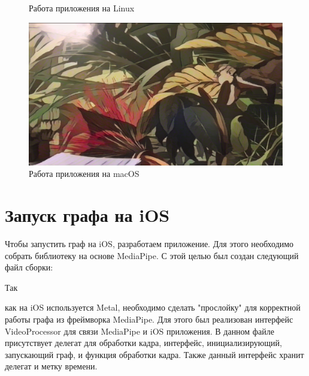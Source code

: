 \documentclass[a4paper,14pt]{extreport}
\begin{document}
\begin{figure}[h]
\begin{center}
\begin{minipage}[h]{0.4\linewidth}
                    \caption{Работа приложения на Linux}
                    \label{ris:graph}
                \end{minipage}
                \hfill
                \begin{minipage}[h]{0.5\linewidth}
                    \includegraphics[width=1\linewidth]{images-code/macOS.png}
                    \caption{Работа приложения на macOS}
                    \label{ris:pbtxt}
                \end{minipage}
            \end{center}
        \end{figure}

        \section{Запуск графа на iOS}
        Чтобы запустить граф на iOS, разработаем приложение. Для этого необходимо собрать библиотеку на основе MediaPipe. С этой целью был создан следующий файл сборки:
        

        \hypertarget{delegate}{Так} как на iOS используется Metal, необходимо сделать "прослойку" для корректной работы графа из фреймворка MediaPipe. Для этого был реализован интерфейс VideoProcessor для связи MediaPipe и iOS приложения. В данном файле присутствует делегат для обработки кадра, интерфейс, инициализирующий, запускающий граф, и функция обработки кадра. Также данный интерфейс хранит делегат и метку времени.
        
\end{document}
